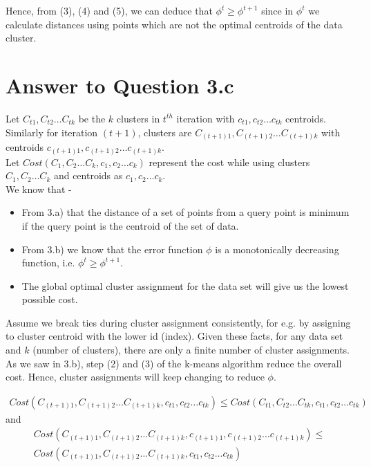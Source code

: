 \documentclass[11pt]{article}
\begin{document}
{Hence, from (3), (4) and (5), we can deduce that $\phi^t \geq \phi^{t+1}$ since in $\phi^t$ we calculate distances using points which are not the optimal centroids of the data cluster.


\pagebreak[4]
\section*{Answer to Question 3.c}
\setcounter{equation}{0}
Let $C_{t1}, C_{t2} \hdots C_{tk}$ be the $k$ clusters in $t^{th}$ iteration with $c_{t1}, c_{t2} \hdots c_{tk}$ centroids. Similarly for iteration $(t+1)$, clusters are $C_{(t+1)1}, C_{(t+1)2} \hdots C_{(t+1)k}$ with centroids $c_{(t+1)1}, c_{(t+1)2} \hdots c_{(t+1)k}$. \\

Let $Cost (C_1, C_2 \hdots C_k, c_1, c_2 \hdots c_k)$ represent the cost while using clusters $C_1, C_2 \hdots C_k$ and centroids as $c_1, c_2 \hdots c_k$.\\

We know that -
\begin{itemize}
\item From 3.a) that the distance of a set of points from a query point is minimum if the query point is the centroid of the set of data.
\item From 3.b) we know that the error function $\phi$ is a monotonically decreasing function, i.e. $\phi^t \geq \phi^{t+1}$.
\item The global optimal cluster assignment for the data set will give us the lowest possible cost. 
\end{itemize}

Assume we break ties during cluster assignment consistently, for e.g. by assigning to cluster centroid with the lower id (index). Given these facts, for any data set and $k$ (number of clusters), there are only a finite number of cluster assignments. \\

As we saw in 3.b), step (2) and (3) of the k-means algorithm reduce the overall cost. Hence, cluster assignments will keep changing to reduce $\phi$.

\begin{equation}\label{eq:simple}
\begin{aligned}
Cost (C_{(t+1)1}, C_{(t+1)2} \hdots C_{(t+1)k}, c_{t1}, c_{t2} \hdots c_{tk}) \leq Cost (C_{t1}, C_{t2} \hdots C_{tk}, c_{t1}, c_{t2} \hdots c_{tk})
\end{aligned}
\end{equation} and
\begin{equation}\label{eq:simple}
\begin{aligned}
Cost (C_{(t+1)1}, C_{(t+1)2} \hdots C_{(t+1)k}, c_{(t+1)1}, c_{(t+1)2} \hdots c_{(t+1)k}) \leq \\
Cost (C_{(t+1)1}, C_{(t+1)2} \hdots C_{(t+1)k}, c_{t1}, c_{t2} \hdots c_{tk})
\end{aligned}
\end{equation}

}
\end{document}
